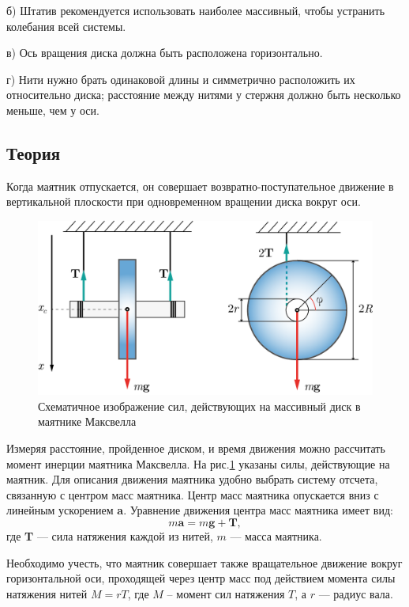 \documentclass[All.tex]{subfiles}
\begin{document}
б) Штатив рекомендуется использовать наиболее массивный, чтобы устранить колебания всей системы.

в) Ось вращения диска должна быть расположена горизонтально.

г) Нити нужно брать одинаковой длины и симметрично расположить их относительно диска; расстояние между нитями у стержня должно быть несколько меньше, чем у оси.
	
\subsection*{\textcolor{PineGreen}{Теория}}
		
	 Когда маятник отпускается, он совершает возвратно-поступательное движение в вертикальной плоскости при одновременном вращении диска вокруг оси.
	
		\begin{figure}[H] 	
		\centering 	
		\includegraphics[width=0.75\linewidth]{Maxwell-3.png}
		\caption{Схематичное изображение сил, действующих на массивный диск в маятнике Максвелла}
		\label{Maxwell-3}
	\end{figure}
	 
	Измеряя расстояние, пройденное диском, и время движения можно рассчитать момент инерции маятника Максвелла.
	На рис.\ref{Maxwell-3} указаны силы, действующие на маятник.
	Для описания движения маятника удобно выбрать систему отсчета, связанную с центром масс маятника.
	Центр масс маятника опускается вниз с линейным ускорением \textbf{a}.
	Уравнение движения центра масс маятника имеет вид:
	\begin{equation}\label{Maxwell-1eq1}
	m\textbf{a} = m\textbf{g} + \textbf{T},
	\end{equation}
	где \textbf{T}  — сила натяжения каждой из нитей, $ m $ — масса маятника.
	
	Необходимо учесть, что маятник совершает также вращательное движение вокруг горизонтальной оси, проходящей через центр масс под действием момента силы натяжения нитей $ M = r T $, где $ M $ – момент сил натяжения $ T $, а $ r $ — радиус вала.
	
\end{document}

